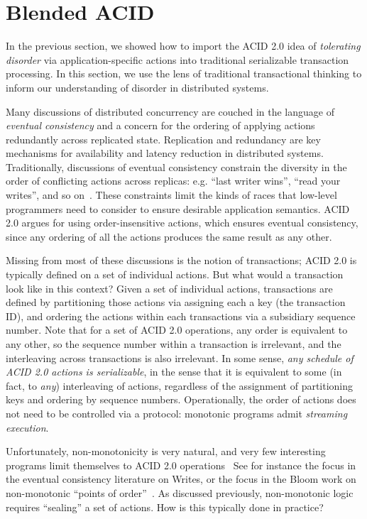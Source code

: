 \documentclass{sig-alternate}
\begin{document}
\section{Blended ACID}
In the previous section, we showed how to import the ACID 2.0 idea of
\emph{tolerating disorder} via application-specific actions into traditional
serializable transaction processing. In this section, we use the lens of
traditional transactional thinking to inform our understanding of disorder in
distributed systems.

Many discussions of distributed concurrency are couched in the language of
\emph{eventual consistency} and a concern for the ordering of applying actions
redundantly across replicated state.  Replication and redundancy are key
mechanisms for availability and latency reduction in distributed systems.
Traditionally, discussions of eventual consistency constrain the diversity in
the order of conflicting actions across replicas: e.g. ``last writer wins'',
``read your writes'', and so on~\cite{terry}.  These constraints limit the kinds
of races that low-level programmers need to consider to ensure desirable
application semantics.  ACID 2.0 argues for using order-insensitive actions,
which ensures eventual consistency, since any ordering of all the actions
produces the same result as any other.

Missing from most of these discussions is the notion of transactions; ACID 2.0
is typically defined on a set of individual actions.  But what would a
transaction look like in this context?  Given a set of individual actions,
transactions are defined by partitioning those actions via assigning each a key
(the transaction ID), and ordering the actions within each transactions via a
subsidiary sequence number.  Note that for a set of ACID 2.0 operations, any
order is equivalent to any other, so the sequence number within a transaction is
irrelevant, and the interleaving across transactions is also irrelevant.  In
some sense, \emph{any schedule of ACID 2.0 actions is serializable}, in the
sense that it is equivalent to some (in fact, to \emph{any}) interleaving of
actions, regardless of the assignment of partitioning keys and ordering by
sequence numbers.  Operationally, the order of actions does not need to be
controlled via a protocol: monotonic programs admit \emph{streaming execution}.

Unfortunately, non-monotonicity is very natural, and very few interesting
programs limit themselves to ACID 2.0 operations~\cite{There is, however, an
  intriguing theoretical result due independently to Immerman, Vardi and
  Papadimitriou that monotonic logic with sequences can express any
  polynomial-time computation.  In our experience to date, this is more
  intriguing than practical.}  See for instance the focus in the eventual
consistency literature on Writes, or the focus in the Bloom work on
non-monotonic ``points of order''~\cite{cidr11}.  As discussed previously,
non-monotonic logic requires ``sealing'' a set of actions.  How is this
typically done in practice?
\end{document}
